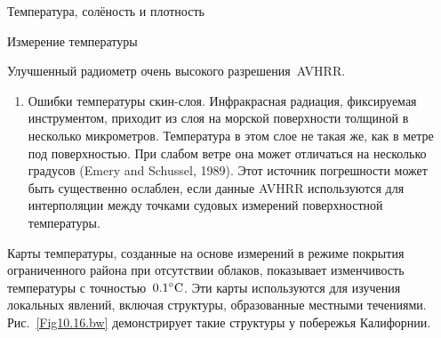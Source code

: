 \begin{chapter}{Температура, солёность и плотность}
\begin{section}{Измерение температуры}
\begin{paragraph}{Улучшенный радиометр очень высокого разрешения~AVHRR.}
\begin{enumerate}

\item
Ошибки температуры скин-слоя. Инфракрасная радиация, фиксируемая
инструментом, приходит из слоя на морской поверхности толщиной в
несколько микрометров. Температура в этом слое не такая же, как в метре
под поверхностью. При слабом ветре она может отличаться на несколько
градусов (Emery and Schussel, 1989). Этот источник погрешности может быть
существенно ослаблен, если данные AVHRR используются для интерполяции между
точками судовых измерений поверхностной температуры.
%
\end{enumerate}

Карты температуры, созданные на основе измерений в режиме покрытия 
ограниченного района при отсутствии облаков, показывает изменчивость 
температуры с точностью~${0.1}^\circ\mbox{C}$. Эти карты используются для 
изучения локальных явлений, включая структуры, образованные местными 
течениями. Рис.~\ref{Fig10.16.bw} демонстрирует такие структуры у побережья 
Калифорнии.
%


\end{paragraph}
\end{section}
\end{chapter}
